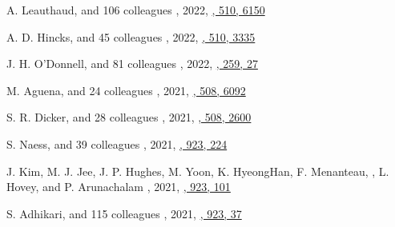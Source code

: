 \begin{etaremune}
\item
A. Leauthaud, and 106 colleagues
,
2022, \href{https://ui.adsabs.harvard.edu/abs/2022MNRAS.510.6150L}{\mnras, 510, 6150}

\item
A. D. Hincks, and 45 colleagues
,
2022, \href{https://ui.adsabs.harvard.edu/abs/2022MNRAS.510.3335H}{\mnras, 510, 3335}

\item
J. H. O'Donnell, and 81 colleagues
,
2022, \href{https://ui.adsabs.harvard.edu/abs/2022ApJS..259...27O}{\apjs, 259, 27}

\item
M. Aguena, and 24 colleagues
,
2021, \href{https://ui.adsabs.harvard.edu/abs/2021MNRAS.508.6092A}{\mnras, 508, 6092}

\item
S. R. Dicker, and 28 colleagues
,
2021, \href{https://ui.adsabs.harvard.edu/abs/2021MNRAS.508.2600D}{\mnras, 508, 2600}

\item
S. Naess, and 39 colleagues
,
2021, \href{https://ui.adsabs.harvard.edu/abs/2021ApJ...923..224N}{\apj, 923, 224}

\item
J. Kim, M. J. Jee, J. P. Hughes, M. Yoon, K. HyeongHan, F. Menanteau, \myself, L. Hovey, and P. Arunachalam
,
2021, \href{https://ui.adsabs.harvard.edu/abs/2021ApJ...923..101K}{\apj, 923, 101}

\item
S. Adhikari, and 115 colleagues
,
2021, \href{https://ui.adsabs.harvard.edu/abs/2021ApJ...923...37A}{\apj, 923, 37}


\end{etaremune}
